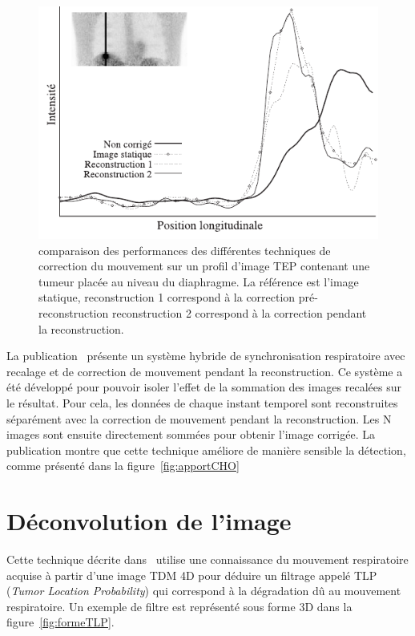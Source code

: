 \begin{figure}[h!]
	\begin{center}
		\includegraphics[width=12cm]{images/lamare2007list.pdf}
	\end{center}
	\caption{comparaison des performances des différentes techniques de correction du mouvement sur un profil d'image TEP contenant une tumeur placée au niveau du diaphragme. La référence est l'image statique, reconstruction 1 correspond à la correction pré-reconstruction reconstruction 2 correspond à la correction pendant la reconstruction.} 
	\label{fig:lamare2007}
\end{figure}

La publication~\cite{Thielemans2006Lesion} présente un système hybride de synchronisation respiratoire avec recalage et de correction de mouvement pendant la reconstruction. Ce système a été développé pour pouvoir isoler l'effet de la sommation des images recalées sur le résultat. Pour cela, les données de chaque instant temporel sont reconstruites séparément avec la correction de mouvement pendant la reconstruction. Les N images sont ensuite directement sommées pour obtenir l'image corrigée. La publication montre que cette technique améliore de manière sensible la détection, comme présenté dans la figure~\ref{fig:apportCHO}
\label{lab:evolGating}

\section{Déconvolution de l'image}

Cette technique décrite dans~\cite{naqa2006deblurring} utilise une connaissance du mouvement respiratoire acquise à partir d'une image TDM 4D pour déduire un filtrage appelé TLP (\textit{Tumor Location Probability}) qui correspond à la dégradation dû au mouvement respiratoire. Un exemple de filtre est représenté sous forme 3D dans la figure~\ref{fig:formeTLP}.

